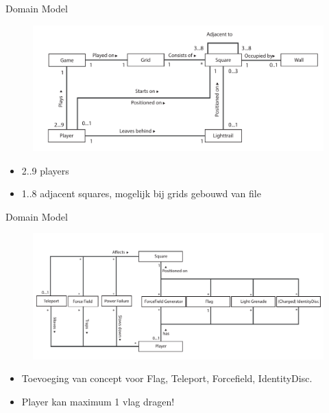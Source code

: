 \documentclass[11pt,t]{beamer}
\begin{document}
\begin{frame}{Domain Model}

\begin{center}
\begin{figure}
\includegraphics[width=0.9\linewidth]{images/domainmodel2}
\end{figure}
\end{center}
\begin{itemize}
\item 2..9 players
\item 1..8 adjacent squares, mogelijk bij grids gebouwd van file
\end{itemize}
\end{frame}

\begin{frame}{Domain Model}
\begin{center}
\begin{figure}
\includegraphics[width=0.9\linewidth]{images/domainmodel1}
\end{figure}
\end{center}
\begin{itemize}
\item Toevoeging van concept voor Flag, Teleport, Forcefield, IdentityDisc.
\item Player kan maximum 1 vlag dragen!
\end{itemize}


\end{frame}
\end{document}
